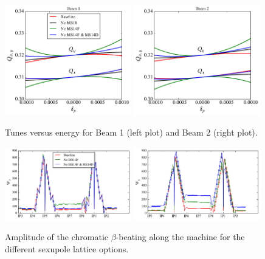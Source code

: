 \documentclass{cernatsnote}
\begin{document}
\begin{figure}[h!]
\centering
\includegraphics[width=0.49\textwidth]{images/qxy_vs_dp_all_b1.pdf} \hfill \includegraphics[width=0.49\textwidth]{images/qxy_vs_dp_all_b2.pdf}
\caption{\label{q_vs_dp_all} Tunes versus energy for Beam 1 (left plot) and Beam 2 (right plot). }
\end{figure}

\begin{figure}[h!]
\centering
\includegraphics[width=0.49\textwidth]{images/twiss_wx_all_b1.pdf} \hfill \includegraphics[width=0.49\textwidth]{images/twiss_wy_all_b1.pdf}
\caption{\label{w_all} Amplitude of the chromatic $\beta$-beating along the machine for the different sexupole lattice options. }
\end{figure}
\end{document}
